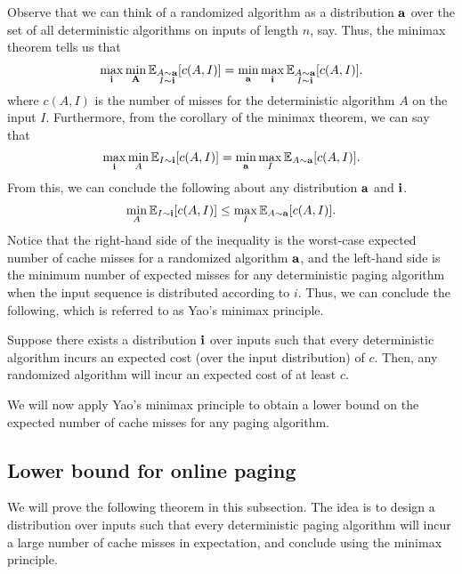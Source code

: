 Observe that we can think of a randomized algorithm as a distribution $\mathbf{a}$ over the set of all deterministic algorithms on inputs of length $n$, say. Thus, the minimax theorem tells us that 
\begin{align*}
	\max_{\mathbf{i}} \min_{\mathbf{A}} \mathbb{E}_{\substack{A\sim \mathbf{a}\\ I\sim \mathbf{i}}}[c(A,I)] = \min_{\mathbf{a}} \max_{\mathbf{i}} \mathbb{E}_{\substack{A\sim \mathbf{a}\\ I\sim \mathbf{i}}}[c(A,I)].
\end{align*}
where $c(A,I)$ is the number of misses for the deterministic algorithm $A$ on the input $I$. Furthermore, from the corollary of the minimax theorem, we can say that
\begin{align*}
	\max_{\mathbf{i}} \min_A \mathbb{E}_{I\sim \mathbf{i}} [c(A,I)] = \min_{\mathbf{a}} \max_I \mathbb{E}_{A\sim \mathbf{a}} [c(A,I)].
\end{align*}
From this, we can conclude the following about any distribution $\mathbf{a}$ and $\mathbf{i}$.
\begin{align*}
	\min_A \mathbb{E}_{I\sim \mathbf{i}}[c(A,I)] \leq \max_I\mathbb{E}_{A\sim \mathbf{a}}[c(A,I)].
\end{align*}
Notice that the right-hand side of the inequality is the worst-case expected number of cache misses for a randomized algorithm $\mathbf{a}$, and the left-hand side is the minimum number of expected misses for any deterministic paging algorithm when the input sequence is distributed according to $i$. Thus, we can conclude the following, which is referred to as Yao's minimax principle.
\begin{theorem}
	Suppose there exists a distribution $\mathbf{i}$ over inputs such that every deterministic algorithm incurs an expected cost (over the input distribution) of $c$. Then, any randomized algorithm will incur an expected cost of at least $c$.
	\label{thm:yao}
\end{theorem}

We will now apply Yao's minimax principle to obtain a lower bound on the expected number of cache misses for any paging algorithm.

\subsection{Lower bound for online paging}

We will prove the following theorem in this subsection. The idea is to design a distribution over inputs such that every deterministic paging algorithm will incur a large number of cache misses in expectation, and conclude using the minimax principle. 

